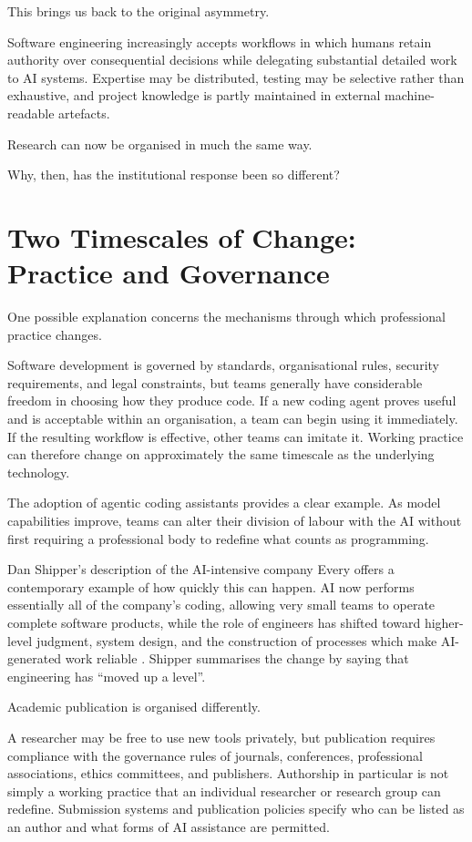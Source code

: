 This brings us back to the original asymmetry.

Software engineering increasingly accepts workflows in which humans retain authority over consequential decisions while delegating substantial detailed work to AI systems. Expertise may be distributed, testing may be selective rather than exhaustive, and project knowledge is partly maintained in external machine-readable artefacts.

Research can now be organised in much the same way.

Why, then, has the institutional response been so different?


\section{Two Timescales of Change: Practice and Governance}

One possible explanation concerns the mechanisms through which professional practice changes.

Software development is governed by standards, organisational rules, security requirements, and legal constraints, but teams generally have considerable freedom in choosing how they produce code. If a new coding agent proves useful and is acceptable within an organisation, a team can begin using it immediately. If the resulting workflow is effective, other teams can imitate it. Working practice can therefore change on approximately the same timescale as the underlying technology.

The adoption of agentic coding assistants provides a clear example. As model capabilities improve, teams can alter their division of labour with the AI without first requiring a professional body to redefine what counts as programming.

Dan Shipper's description of the AI-intensive company Every offers a contemporary example of how quickly this can happen. AI now performs essentially all of the company's coding, allowing very small teams to operate complete software products, while the role of engineers has shifted toward higher-level judgment, system design, and the construction of processes which make AI-generated work reliable \citep{newton2026editorclone}. Shipper summarises the change by saying that engineering has ``moved up a level''.

Academic publication is organised differently.

A researcher may be free to use new tools privately, but publication requires compliance with the governance rules of journals, conferences, professional associations, ethics committees, and publishers. Authorship in particular is not simply a working practice that an individual researcher or research group can redefine. Submission systems and publication policies specify who can be listed as an author and what forms of AI assistance are permitted.


